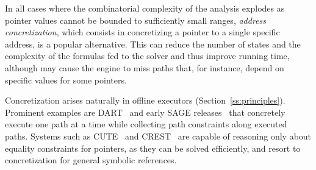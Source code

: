 In all cases where the combinatorial complexity of the analysis explodes as pointer values cannot be bounded to sufficiently small ranges, {\em address concretization}, which consists in concretizing a pointer to a single specific address, is a popular alternative. This can reduce the number of states and the complexity of the formulas fed to the solver and thus improve running time, although may cause the engine to miss paths that, for instance, depend on specific values for some pointers. 

Concretization arises naturally in offline executors (Section~\ref{ss:principles}). Prominent examples are {\sc DART}~\cite{DART-PLDI05} and early {\sc SAGE} releases~\cite{SAGE-NDSS08} that concretely execute one path at a time while collecting path constraints along executed paths. %
Systems such as {\sc CUTE}~\cite{CUTE-FSE05} and {\sc CREST}~\cite{CREST-ASE08} are capable of reasoning only about equality constraints for pointers, as they can be solved efficiently, and resort to concretization for general symbolic references. %






